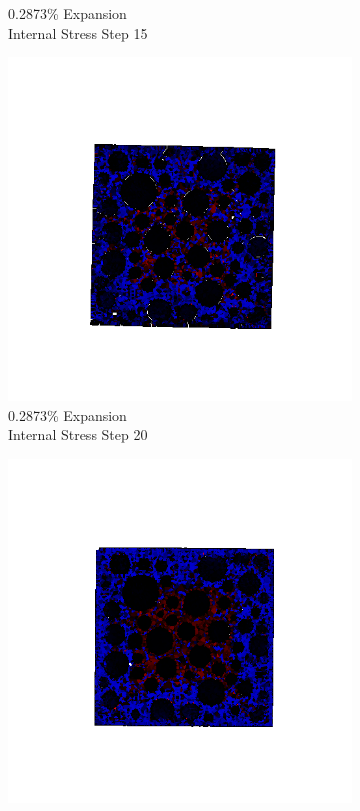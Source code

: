 \begin{figure}[h!]
\begin{subfigure}{.25\textwidth}
      \caption{0.2873\% Expansion\\Internal Stress Step 15}
    \end{subfigure}%
    \begin{subfigure}{.25\textwidth}
      \centering
      \includegraphics[width=1.0\linewidth]{Files/exp_3D/DEF/A30X0C_2_stress.png}
      \caption{0.2873\% Expansion\\Internal Stress Step 20}
    \end{subfigure}
    \begin{subfigure}{.25\textwidth}
      \centering
      \includegraphics[width=1.0\linewidth]{Files/exp_3D/DEF/A30X0C_3_s5.png}

\end{subfigure}
\end{figure}
